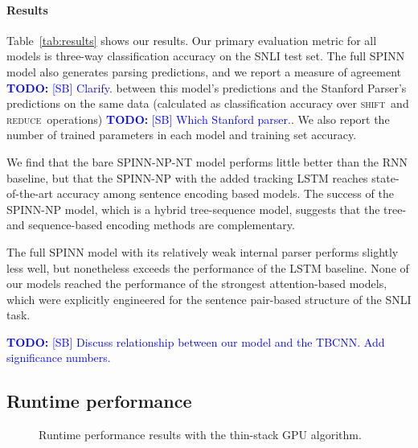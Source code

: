 \documentclass[11pt]{article}
\newcommand\todo[1]{\textcolor{blue}{\textbf{TODO:} #1}}
\newcommand{\shift}{\textsc{shift}}
\newcommand{\reduce}{\textsc{reduce}}
\begin{document}
\paragraph{Results} Table~\ref{tab:results} shows our results. Our primary evaluation metric for all models is three-way classification accuracy on the SNLI test set. The full SPINN model also generates parsing predictions, and we report a measure of agreement \todo{[SB] Clarify.} between this model's predictions and the Stanford Parser's predictions on the same data (calculated as classification accuracy over \shift~and \reduce~operations) \todo{[SB] Which Stanford parser.}. We also report the number of trained parameters in each model and training set accuracy.

We find that the bare SPINN-NP-NT model performs little better than the RNN baseline, but that the SPINN-NP with the added tracking LSTM reaches state-of-the-art accuracy among sentence encoding based models. The success of the SPINN-NP model, which is a hybrid tree-sequence model, suggests that the tree- and sequence-based encoding methods are complementary.

The full SPINN model with its relatively weak internal parser performs slightly less well, but nonetheless exceeds the performance of the LSTM baseline. None of our models reached the performance of the strongest attention-based models, which were explicitly engineered for the sentence pair-based structure of the SNLI task.

\todo{[SB] Discuss relationship between our model and the TBCNN. Add significance numbers.}

\subsection{Runtime performance}
\label{sec:speed}

\begin{figure}
\caption{Runtime performance results with the thin-stack GPU algorithm.}
\label{fig:speed}
\end{figure}
\end{document}
